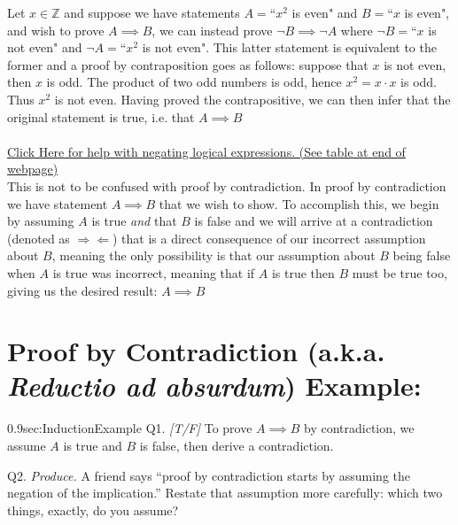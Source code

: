 Let $x\in \mathbb{Z}$ and suppose we have statements $A=$``$x^2$ is even" and $B=$``$x$ is even", and wish to prove $A\implies B$, we can instead prove $\lnot B \implies \lnot A$ where $\lnot B=$``$x$ is not even" and $\lnot A=$``$x^2$ is not even". This latter statement is equivalent to the former and a proof by contraposition goes as follows: suppose that $x$ is not even, then $x$ is odd. The product of two odd numbers is odd, hence $x^2 = x\cdot x$ is odd. Thus $x^2$ is not even. Having proved the contrapositive, we can then infer that the original statement is true, i.e. that $A \implies B$ \\ \\
\href{https://www.math.toronto.edu/preparing-for-calculus/3_logic/we_3_negation.html}{Click Here for help with negating logical expressions. (See table at end of webpage)}\\

\noindent This is not to be confused with proof by contradiction. In proof by contradiction we have statement $A\implies B$ that we wish to show. To accomplish this, we begin by assuming $A$ is true \textit{and} that $B$ is false and we will arrive at a contradiction (denoted as $\Rightarrow\Leftarrow$) that is a direct consequence of our incorrect assumption about $B$, meaning the only possibility is that our assumption about $B$ being false when $A$ is true was incorrect, meaning that if $A$ is true then $B$ must be true too, giving us the desired result: $A \implies B$ 

\noindent\section{Proof by Contradiction (a.k.a.
\textit{Reductio ad absurdum}) Example:}
\label{sec:RAAExample}

\begin{selfcheckbox}{0.9}{sec:InductionExample}
  \hypertarget{q:ch0:contra}{}
  Q1. \textit{[T/F]} To prove $A \implies B$ by contradiction, we assume $A$ is true and $B$ is false, then derive a contradiction.\par\smallskip
  Q2. \textit{Produce.} A friend says ``proof by contradiction starts by assuming the negation of the implication.'' Restate that assumption more carefully: which two things, exactly, do you assume?
  \par\medskip\hfill{}
\end{selfcheckbox}

